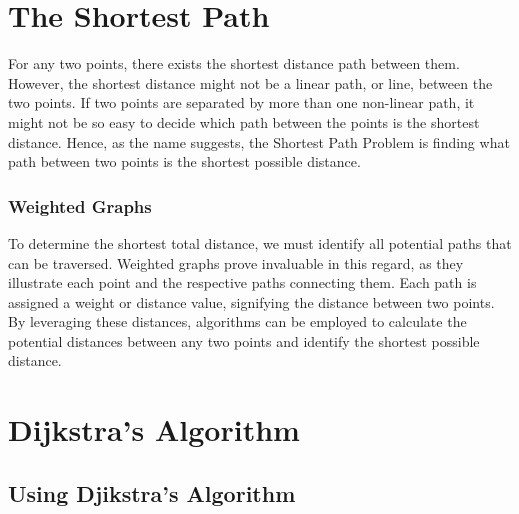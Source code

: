 \documentclass{article}
\begin{document}
\section{The Shortest Path}

        For any two points, there exists the shortest distance path between them. However, the shortest distance might not be a linear path, or line, between the two points. If two points are separated by more than one non-linear path, it might not be so easy to decide which path between the points is the shortest distance. Hence, as the name suggests, the Shortest Path Problem is finding what path between two points is the shortest possible distance.

        \subsubsection{Weighted Graphs}
        
            To determine the shortest total distance, we must identify all potential paths that can be traversed. Weighted graphs prove invaluable in this regard, as they illustrate each point and the respective paths connecting them. Each path is assigned a weight or distance value, signifying the distance between two points. By leveraging these distances, algorithms can be employed to calculate the potential distances between any two points and identify the shortest possible distance.

\section{Dijkstra's Algorithm}

    \subsection{Using Djikstra's Algorithm}
\end{document}
